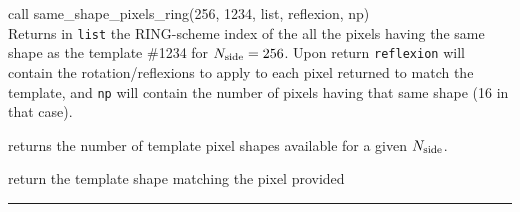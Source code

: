 \begin{example}
{
call same\_shape\_pixels\_ring(256, 1234, list, reflexion, np)  \\
}
{
Returns in {\tt list} the RING-scheme index of the all the pixels having
the same shape as the template \#1234 for ${N_{\rm side}}=256$. Upon return {\tt reflexion} will
contain the rotation/reflexions to apply to each pixel returned to match the template,
and {\tt np} will contain the number of pixels having that same shape (16 in that case).
}
\end{example}
\begin{related}
  \begin{sulist}{} %
  \item[\htmlref{nside2templates}{sub:nside2ntemplates}] returns the
  number of template pixel shapes available for a given ${N_{\rm side}}$.
  \item[\htmlref{template\_pixel\_ring}{sub:template_pixel_xxx}] 
  \item[\htmlref{template\_pixel\_nest}{sub:template_pixel_xxx}] 
  return
  the template shape matching the pixel provided
  \end{sulist}
\end{related}

\rule{\hsize}{2mm}

